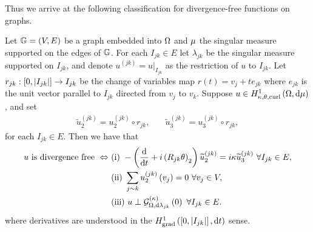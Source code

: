 Thus we arrive at the following classification for divergence-free functions on graphs.
\begin{cory} \label{cory:DivFreeWholeGraph}
	Let $\mathbb{G}=\left( V,E \right)$ be a graph embedded into $\Omega$ and $\mu$ the singular measure supported on the edges of $\mathbb{G}$.
	For each $I_{jk}\in E$ let $\lambda_{jk}$ be the singular measure supported on $I_{jk}$, and denote $u^{(jk)} = u\vert_{I_{jk}}$ as the restriction of $u$ to $I_{jk}$.
	Let $r_{jk}:\left[ 0,\left\lvert I_{jk} \right\rvert \right]\rightarrow I_{jk}$ be the change of variables map $r(t)=v_{j} + te_{jk}$ where $e_{jk}$ is the unit vector parallel to $I_{jk}$ directed from $v_j$ to $v_k$.
	Suppose $u\in H^1_{\kappa,\theta,\mathrm{curl}}\left( \Omega, \mathrm{d}\mu \right)$, and set 
	\begin{align*}
		\widetilde{u}^{(jk)}_2 = u^{(jk)}_2 \circ r_{jk},
		&\quad \widetilde{u}^{(jk)}_3 = u^{(jk)}_3 \circ r_{jk},
	\end{align*}
	for each $I_{jk}\in E$.
	Then we have that
	\begin{align*}
		u \text{ is divergence free } \Leftrightarrow 
		& \ \text{(i)} \ -\bracs{\diff{}{t} + i\bracs{R_{jk}\qm}_2}\widetilde{u}^{(jk)}_2 = i\wavenumber\widetilde{u}^{(jk)}_3 \ \forall I_{jk}\in E, \\
		& \ \text{(ii)} \ \sum_{j\sim k}u_2^{(jk)}\bracs{v_j} = 0 \ \forall v_j\in V, \\
		& \ \text{(iii)} \ u \perp \kgradZero{\ddom}{\lambda_{jk}} \ \forall I_{jk}\in E.
	\end{align*}
	where derivatives are understood in the $H^1_\mathrm{grad}\left( \left[ 0,\left\lvert I_{jk} \right\rvert \right], \mathrm{d}t \right)$ sense.
\end{cory}
